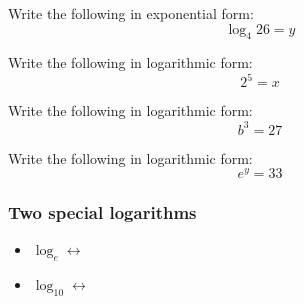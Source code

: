 \vspace{0.5em}

\begin{exercise}
Write the following in exponential form:
\[
\log_4 26=y
\]
\end{exercise}
\begin{solution}[1in]

\end{solution}

\vspace{0.5em}

\begin{exercise}
Write the following in logarithmic form:
\[
2^5=x
\]
\end{exercise}
\begin{solution}[1in]

\end{solution}

\vspace{0.5em}

\begin{exercise}
Write the following in logarithmic form:
\[
b^3=27
\]
\end{exercise}
\begin{solution}[1in]

\end{solution}

\vspace{0.5em}

\begin{exercise}
Write the following in logarithmic form:
\[
e^y=33
\]
\end{exercise}
\begin{solution}[1in]

\end{solution}

\vspace{0.5em}

\subsubsection*{Two special logarithms}

\begin{itemize}
    \item $\log_e\longleftrightarrow$
    \item $\log_{10}\longleftrightarrow$
\end{itemize}

